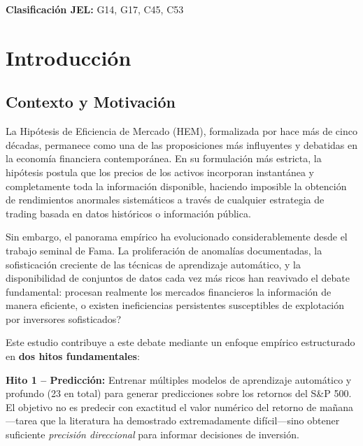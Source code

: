 \documentclass[11pt,a4paper]{article}
\begin{document}
\vspace{0.5cm}

\textbf{Clasificaci\'on JEL:} G14, G17, C45, C53

\vspace{1cm}

\tableofcontents
\newpage

\section{Introducci\'on}

\subsection{Contexto y Motivaci\'on}

La Hip\'otesis de Eficiencia de Mercado (HEM), formalizada por \citet{fama1970} hace m\'as de cinco d\'ecadas, permanece como una de las proposiciones m\'as influyentes y debatidas en la econom\'ia financiera contempor\'anea. En su formulaci\'on m\'as estricta, la hip\'otesis postula que los precios de los activos incorporan instant\'anea y completamente toda la informaci\'on disponible, haciendo imposible la obtenci\'on de rendimientos anormales sistem\'aticos a trav\'es de cualquier estrategia de trading basada en datos hist\'oricos o informaci\'on p\'ublica.

Sin embargo, el panorama emp\'irico ha evolucionado considerablemente desde el trabajo seminal de Fama. La proliferaci\'on de anomal\'ias documentadas, la sofisticaci\'on creciente de las t\'ecnicas de aprendizaje autom\'atico, y la disponibilidad de conjuntos de datos cada vez m\'as ricos han reavivado el debate fundamental: \textquestiondown procesan realmente los mercados financieros la informaci\'on de manera eficiente, o existen ineficiencias persistentes susceptibles de explotaci\'on por inversores sofisticados?

Este estudio contribuye a este debate mediante un enfoque emp\'irico estructurado en \textbf{dos hitos fundamentales}:

\textbf{Hito 1 -- Predicci\'on:} Entrenar m\'ultiples modelos de aprendizaje autom\'atico y profundo (23 en total) para generar predicciones sobre los retornos del S\&P 500. El objetivo no es predecir con exactitud el valor num\'erico del retorno de ma\~nana---tarea que la literatura ha demostrado extremadamente dif\'icil---sino obtener suficiente \textit{precisi\'on direccional} para informar decisiones de inversi\'on.
\end{document}
